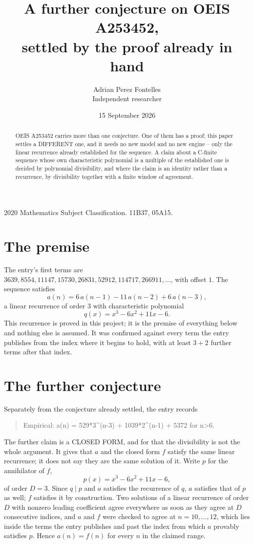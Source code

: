 \documentclass[11pt,a4paper]{article}
\title{A further conjecture on OEIS A253452,\\ \large settled by the proof already in hand}
\author{Adrian Perez Fontelles\\ \small Independent researcher}
\date{15 September 2026}
\theoremstyle{plain}
\theoremstyle{definition}
\begin{document}
\maketitle

\begin{abstract}
OEIS A253452 carries more than one conjecture. One of them has a proof; this paper settles a
DIFFERENT one, and it needs no new model and no new engine -- only the linear recurrence already
established for the sequence. A claim about a C-finite sequence whose own characteristic
polynomial is a multiple of the established one is decided by polynomial divisibility, and where
the claim is an identity rather than a recurrence, by divisibility together with a finite window
of agreement.
\end{abstract}

\noindent\small 2020 Mathematics Subject Classification. 11B37, 05A15.\normalsize

\section{The premise}

The entry's first terms are $3639, 8554, 11147, 15730, 26831, 52912, 114717, 266911,\dots$, with offset $1$. The sequence satisfies
\[
  a(n)=6\,a(n-1) - 11\,a(n-2) + 6\,a(n-3) ,
\]
a linear recurrence of order $3$ with characteristic polynomial
\[
  q(x)=x^{3} - 6 x^{2} + 11 x - 6 .
\]
This recurrence is proved in this project; it is the premise of everything below and nothing else is assumed.
It was confirmed against every term the entry publishes from the index where it begins to hold,
with at least $3+2$ further terms after that index.

\section{The further conjecture}

Separately from the conjecture already settled, the entry records

\begin{quote}\raggedright Empirical: a(n) = 529*3\^{}(n-3) + 1039*2\^{}(n-1) + 5372 for n>6.\end{quote}

The further claim is a CLOSED FORM, and for that the divisibility is not the whole argument. It
gives that $a$ and the closed form $f$ satisfy the same linear recurrence; it does not say they
are the same solution of it. Write $p$ for the annihilator of $f$,
\[
  p(x)=x^{3} - 6 x^{2} + 11 x - 6 ,
\]
of order $D=3$. Since $q\mid p$ and $a$ satisfies the recurrence of $q$, $a$ satisfies that of
$p$ as well; $f$ satisfies it by construction. Two solutions of a linear recurrence of order $D$
with nonzero leading coefficient agree everywhere as soon as they agree at $D$ consecutive
indices, and $a$ and $f$ were checked to agree at $n=10,\dots,12$,
which lies inside the terms the entry publishes and past the index from which $a$ provably
satisfies $p$. Hence $a(n)=f(n)$ for every $n$ in the claimed range.
\end{document}
